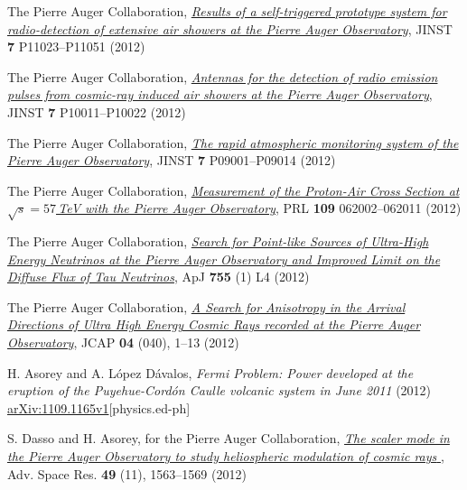 \begin{etaremune}
\item {}The Pierre Auger Collaboration,
\href{http://dx.doi.org/10.1088/1748-0221/7/11/P11023}{\emph{Results of a
self-triggered prototype system for radio-detection of extensive air showers at
the Pierre Auger Observatory}}, JINST {\bf{7}} P11023--P11051 (2012)

\item {}The Pierre Auger Collaboration,
\href{http://dx.doi.org/10.1088/1748-0221/7/10/P10011}{\emph{Antennas for the
detection of radio emission pulses from cosmic-ray induced air showers at the
Pierre Auger Observatory}}, JINST {\bf{7}} P10011--P10022 (2012)

\item {}The Pierre Auger Collaboration,
\href{http://dx.doi.org/10.1088/1748-0221/7/09/P09001}{\emph{The rapid
atmospheric monitoring system of the Pierre Auger Observatory}}, JINST
{\bf{7}} P09001--P09014 (2012)

\item {}The Pierre Auger Collaboration,
\href{http://dx.doi.org/10.1103/PhysRevLett.109.062002}{\emph{Measurement of
the Proton-Air Cross Section at $\sqrt{s}=57$\,TeV with the Pierre Auger
Observatory}}, PRL {\bf{109}} 062002--062011 (2012)

\item {}The Pierre Auger Collaboration,
\href{http://dx.doi.org/10.1088/2041-8205/755/1/L4}{\emph{Search for Point-like
Sources of Ultra-High Energy Neutrinos at the Pierre Auger Observatory and
Improved Limit on the Diffuse Flux of Tau Neutrinos}}, ApJ {\bf{755}} (1) L4
(2012)

\item {}The Pierre Auger Collaboration, 
\href{http://dx.doi.org/10.1088/1475-7516/2012/04/040}{\emph{A Search for
Anisotropy in the Arrival Directions of Ultra High Energy Cosmic Rays recorded
at the Pierre Auger Observatory}}, JCAP {\bf{04}} (040), 1--13 (2012)

\item {}H. Asorey and A. López Dávalos, {\emph{Fermi Problem: Power
developed at the eruption of the Puyehue-Cordón Caulle volcanic system in June
2011}} (2012)
\href{http://arxiv.org/abs/1109.1165}{arXiv:1109.1165v1}[physics.ed-ph]

\item {}S. Dasso and H. Asorey, for the Pierre Auger Collaboration,
\href{http://dx.doi.org/10.1016/j.asr.2011.12.028}{\emph{ The scaler mode in
the Pierre Auger Observatory to study heliospheric modulation of cosmic rays
}}, Adv. Space Res. {\bf{49}} (11), 1563--1569 (2012)


\end{etaremune}
